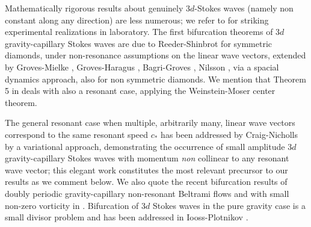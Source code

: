 \documentclass[11pt,a4paper,reqno]{article}
\numberwithin{equation}{section}
\theoremstyle{definition}
\begin{document}
Mathematically rigorous results about genuinely $ 3d $-Stokes waves (namely non constant along any direction)
are less numerous; we refer to  \cite{HHS} for striking experimental realizations in  laboratory.  
The first bifurcation theorems of $ 3d$ gravity-capillary Stokes waves are due to Reeder-Shinbrot \cite{RS} for symmetric diamonds, under non-resonance
assumptions on the %
linear wave vectors,   extended  by Groves-Mielke \cite{GrovesMielke}, 
Groves-Haragus \cite{GrovesHaragus},  
Bagri-Groves \cite{BG}, Nilsson \cite{Nil}, via a spacial dynamics approach, also for non symmetric diamonds. We mention that 
Theorem 5 in  
\cite{GrovesHaragus}
deals with also a 
resonant case,  %
applying the Weinstein-Moser %
center theorem.

The general resonant  case
when multiple, arbitrarily many,
 linear wave vectors correspond to the same %
resonant speed $c_* $ 
has been addressed by 
Craig-Nicholls \cite{CN,CN2} by  
a variational approach,  demonstrating the occurrence of %
small amplitude 
$3d$ %
gravity-capillary Stokes  waves 
with  
 momentum {\it non} collinear to any resonant wave vector;  
this elegant work  constitutes the most relevant precursor to our results as we comment below.  We also quote 
the   recent bifurcation results \cite{LSW, GNPW} of  doubly periodic gravity-capillary non-resonant  Beltrami flows
and with small non-zero  vorticity in \cite{SVW}.
Bifurcation of $3d$ Stokes waves in the pure gravity case is a small divisor problem and has been addressed in  Iooss-Plotnikov \cite{IP-Mem-2009,IP2}. 

\smallskip 
\end{document}
